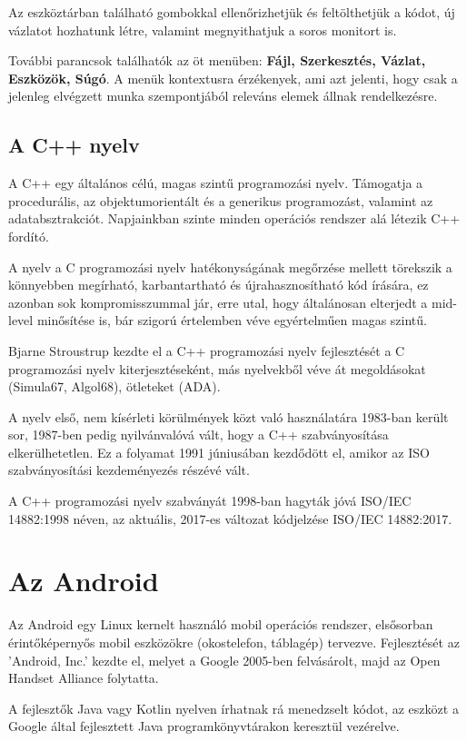 \documentclass[]{thesis-ekf}
\theoremstyle{definition}
\begin{document}
Az eszköztárban található gombokkal ellenőrizhetjük és feltölthetjük a kódot, új vázlatot hozhatunk létre, valamint megnyithatjuk a soros monitort is.

További parancsok találhatók az öt menüben: \textbf{Fájl, Szerkesztés, Vázlat, Eszközök, Súgó}. A menük kontextusra érzékenyek, ami azt jelenti, hogy csak a jelenleg elvégzett munka szempontjából releváns elemek állnak rendelkezésre.
\subsection{A C++ nyelv}
A C++ egy általános célú, magas szintű programozási nyelv. Támogatja a procedurális, az objektumorientált és a generikus programozást, valamint az adatabsztrakciót. Napjainkban szinte minden operációs rendszer alá létezik C++ fordító.

A nyelv a C programozási nyelv hatékonyságának megőrzése mellett törekszik a könnyebben megírható, karbantartható és újrahasznosítható kód írására, ez azonban sok kompromisszummal jár, erre utal, hogy általánosan elterjedt a mid-level minősítése is, bár szigorú értelemben véve egyértelműen magas szintű.

Bjarne Stroustrup kezdte el a C++ programozási nyelv fejlesztését a C programozási nyelv kiterjesztéseként, más nyelvekből véve át megoldásokat (Simula67, Algol68), ötleteket (ADA).

A nyelv első, nem kísérleti körülmények közt való használatára 1983-ban került sor, 1987-ben pedig nyilvánvalóvá vált, hogy a C++ szabványosítása elkerülhetetlen. Ez a folyamat 1991 júniusában kezdődött el, amikor az ISO szabványosítási kezdeményezés részévé vált.

A C++ programozási nyelv szabványát 1998-ban hagyták jóvá ISO/IEC 14882:1998 néven, az aktuális, 2017-es változat kódjelzése ISO/IEC 14882:2017.
\section{Az Android}
Az Android egy Linux kernelt használó mobil operációs rendszer, elsősorban érintőképernyős mobil eszközökre (okostelefon, táblagép) tervezve. Fejlesztését az ’Android, Inc.’ kezdte el, melyet a Google 2005-ben felvásárolt, majd az Open Handset Alliance folytatta.

A fejlesztők Java vagy Kotlin nyelven írhatnak rá menedzselt kódot, az eszközt a Google által fejlesztett Java programkönyvtárakon keresztül vezérelve.
\end{document}
